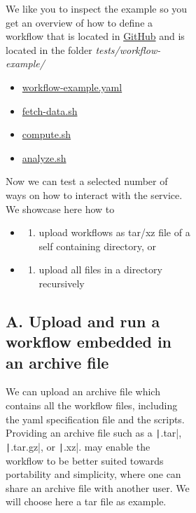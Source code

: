 \begin{figure}[htb]
\begin{figure}[htb]
\begin{figure}[htb]
We like you to inspect the example so you get an overview of how to
define a workflow that is located in
\href{https://github.com/cloudmesh/cloudmesh-cc/tree/main/tests/workflow-example}{GitHub} and is located in the folder \emph{tests/workflow-example/}

\begin{itemize}
\item
  \href{https://github.com/cloudmesh/cloudmesh-cc/blob/main/tests/workflow-example/workflow-example.yaml}{workflow-example.yaml}
\item
  \href{https://github.com/cloudmesh/cloudmesh-cc/blob/main/tests/workflow-example/fetch-data.sh}{fetch-data.sh}
\item
  \href{https://github.com/cloudmesh/cloudmesh-cc/blob/main/tests/workflow-example/compute.sh}{compute.sh}
\item
  \href{https://github.com/cloudmesh/cloudmesh-cc/blob/main/tests/workflow-example/analyze.sh}{analyze.sh}
\end{itemize}

Now we can test a selected number of ways on how to interact with the
service. We showcase here how to

\begin{itemize}
\item
  \begin{enumerate}
  \def\labelenumi{\Alph{enumi}.}
  \item
    upload workflows as tar/xz file of a self containing directory, or
  \end{enumerate}
\item
  \begin{enumerate}
  \def\labelenumi{\Alph{enumi}.}
  \setcounter{enumi}{1}
  \item
    upload all files in a directory recursively
  \end{enumerate}
\end{itemize}

\subsection{A. Upload and run a workflow embedded in an archive
file}\label{a.-upload-and-run-a-workflow-embedded-in-an-archive-file}

We can upload an archive file which contains all the workflow files,
including the yaml specification file and the scripts. Providing an
archive file such as a \texttt|.tar|, \texttt|.tar.gz|, or \texttt|.xz|.
may enable the workflow to be better suited towards portability and
simplicity, where one can share an archive file with another user. We
will choose here a tar file as example.


\end{figure}
\end{figure}
\end{figure}
